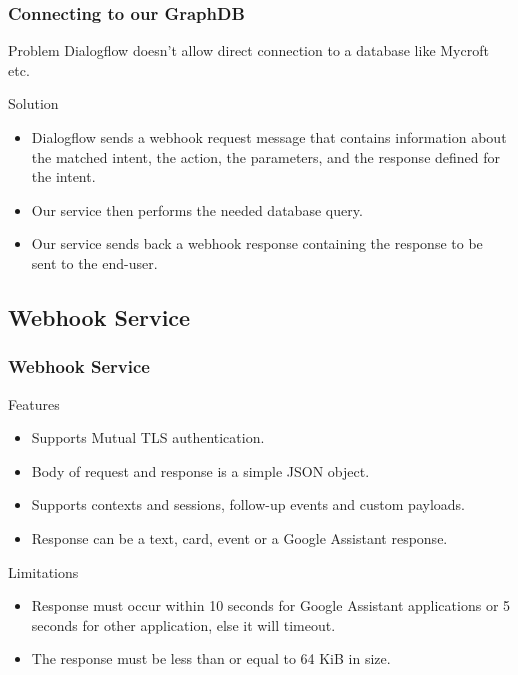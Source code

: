 \documentclass{beamer}
\begin{document}
\begin{frame}
\frametitle{Connecting to our GraphDB}
\begin{block}{Problem}
Dialogflow doesn't allow direct connection to a database like Mycroft etc.
\end{block}


\begin{block}{Solution}
\begin{itemize}
\item Dialogflow sends a webhook request message that contains information about the matched intent, the action, the parameters, and the response defined for the intent.
\item Our service then performs the needed database query.
\item Our service sends back a webhook response containing the response to be sent to the end-user.
\end{itemize}
\end{block}

\end{frame}


\subsection{Webhook Service}

\begin{frame}
\frametitle{Webhook Service}
\begin{block}{Features}
\begin{itemize}
\item Supports Mutual TLS authentication.
\item Body of request and response is a simple JSON object.
\item Supports contexts and sessions, follow-up events and custom payloads.
\item Response can be a text, card, event or a Google Assistant response.
\end{itemize}
\end{block}


\begin{block}{Limitations}
\begin{itemize}
\item Response must occur within 10 seconds for Google Assistant applications or 5 seconds for other application, else it will timeout. 
\item The response must be less than or equal to 64 KiB in size.
\end{itemize}
\end{block}

\end{frame}
\end{document}
